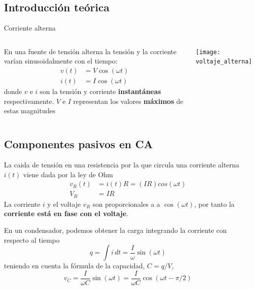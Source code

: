 \documentclass[]{presentation}
\begin{document}
\subsection{Introducción teórica}
\begin{frame}{Corriente alterna}
\begin{columns}
	\justifying
	En una fuente de tensión alterna la tensión y la corriente varían sinusoidalmente con el tiempo:
	\begin{align}
	v(t) & = V \cos (\omega t) \nonumber\\
	i(t) & = I \cos (\omega t) \nonumber
	\end{align}
	donde $v$ e $i$ son la tensión y corriente \textbf{instantáneas} respectivamente. $V$ e $I$ representan los valores \textbf{máximos} de estas magnitudes    
	\begin{center}
		\texttt{[image: voltaje\_alterna]}
	\end{center}
\end{columns}
\end{frame}

\subsection{Componentes pasivos en CA}
\begin{frame}
	La caida de tensión en una resistencia por la que circula una corriente alterna $i(t)$ viene dada por la ley de Ohm
	\begin{align}
	v_R (t) & = i(t) R = (IR) cos (\omega t) \nonumber \\
	V_R & = IR \nonumber
	\end{align}
	La corriente $i$ y el voltaje $v_R$ son proporcionales a a $\cos(\omega t)$, por tanto la \textbf{corriente está en fase con el voltaje}.   
	
	En un condensador, podemos obtener la carga integrando
	la corriente con respecto al tiempo
	$$
	q = \int i \, dt = \frac{I}{\omega} \sin (\omega t)
	$$
	teniendo en cuenta la fórmula de la capacidad, $C = q/V$,
	$$
	v_C = \frac{I}{\omega C} \sin(\omega t) 
	= \frac{I}{\omega C} \cos(\omega t - \pi/2)
	$$
\end{frame}
\end{document}
